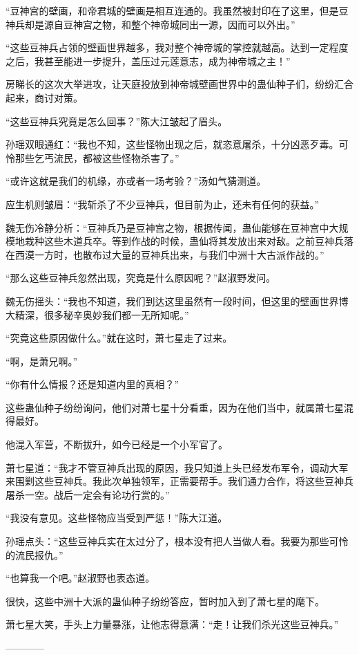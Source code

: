 \begin{this_body}
“豆神宫的壁画，和帝君城的壁画是相互连通的。我虽然被封印在了这里，但是豆神兵却是源自豆神宫之物，和整个神帝城同出一源，因而可以外出。”

“这些豆神兵占领的壁画世界越多，我对整个神帝城的掌控就越高。达到一定程度之后，我甚至能进一步提升，盖压过元莲意志，成为神帝城之主！”

房睇长的这次大举进攻，让天庭投放到神帝城壁画世界中的蛊仙种子们，纷纷汇合起来，商讨对策。

“这些豆神兵究竟是怎么回事？”陈大江皱起了眉头。

孙瑶双眼通红：“我也不知，这些怪物出现之后，就恣意屠杀，十分凶恶歹毒。可怜那些乞丐流民，都被这些怪物杀害了。”

“或许这就是我们的机缘，亦或者一场考验？”汤如气猜测道。

应生机则皱眉：“我斩杀了不少豆神兵，但目前为止，还未有任何的获益。”

魏无伤冷静分析：“豆神兵乃是豆神宫之物，根据传闻，蛊仙能够在豆神宫中大规模地栽种这些木道兵卒。等到作战的时候，蛊仙将其发放出来对敌。之前豆神兵落在西漠一方时，也散布过大量的豆神兵出来，与我们中洲十大古派作战的。”

“那么这些豆神兵忽然出现，究竟是什么原因呢？”赵淑野发问。

魏无伤摇头：“我也不知道，我们到达这里虽然有一段时间，但这里的壁画世界博大精深，很多秘辛奥妙我们都一无所知呢。”

“究竟这些原因做什么。”就在这时，萧七星走了过来。

“啊，是萧兄啊。”

“你有什么情报？还是知道内里的真相？”

这些蛊仙种子纷纷询问，他们对萧七星十分看重，因为在他们当中，就属萧七星混得最好。

他混入军营，不断拔升，如今已经是一个小军官了。

萧七星道：“我才不管豆神兵出现的原因，我只知道上头已经发布军令，调动大军来围剿这些豆神兵。我此次单独领军，正需要帮手。我们通力合作，将这些豆神兵屠杀一空。战后一定会有论功行赏的。”

“我没有意见。这些怪物应当受到严惩！”陈大江道。

孙瑶点头：“这些豆神兵实在太过分了，根本没有把人当做人看。我要为那些可怜的流民报仇。”

“也算我一个吧。”赵淑野也表态道。

很快，这些中洲十大派的蛊仙种子纷纷答应，暂时加入到了萧七星的麾下。

萧七星大笑，手头上力量暴涨，让他志得意满：“走！让我们杀光这些豆神兵。”

------------

\end{this_body}

